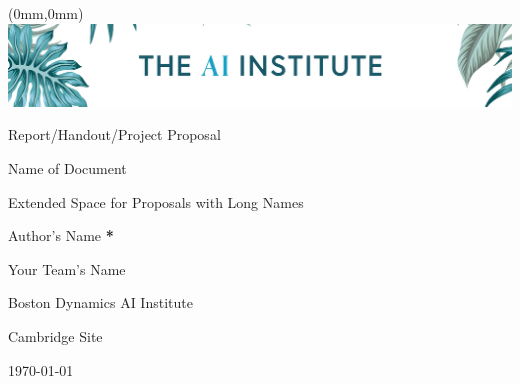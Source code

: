 \documentclass[../bdaii-sample-handout.tex]{subfiles}
\begin{document}
\begin{titlepage}
\begin{textblock*}{\paperwidth}(0mm,0mm)
    \noindent
    \includegraphics[width=\paperwidth]{graphics/channels4_banner_nb.jpg}
\end{textblock*}
\makeatletter
\renewcommand{\thefootnote}{\@fnsymbol\c@footnote}
\makeatother
\setlength{\parindent}{0pt}

\null
\vspace{20em}
{\large Report/Handout/Project Proposal\par}
\vspace{\baselineskip}
{\LARGE Name of Document \par}
{\Large Extended Space for Proposals with Long Names \par}
\vspace{2\baselineskip}

{\large Author's Name \textbf{*}\par} 
{{Your Team's Name} \par}
\vspace{\baselineskip}

\vspace{12\baselineskip}
{{Boston Dynamics AI Institute} \par} 
{{Cambridge Site} \par} 
\today\par
{}

\end{titlepage}
\end{document}
